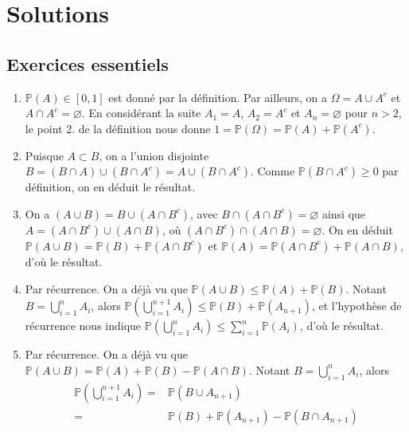 \chapter{Solutions}

\section{Exercices essentiels}\label{I-exercices-essentiels}

\label{I-answer-propelem}

\begin{enumerate}
\def\labelenumi{\arabic{enumi}.}
\item
  \(\mathbb{P}(A) \in [0,1]\) est donné par la définition. Par ailleurs,
  on a \(\Omega = A \cup A^c\) et \(A\cap A^c = \varnothing\). En
  considérant la suite \(A_1 = A\), \(A_2 = A^c\) et
  \(A_n = \varnothing\) pour \(n > 2\), le point 2. de la définition
  nous donne
  \(1 = \mathbb{P}(\Omega) = \mathbb{P}(A) + \mathbb{P}(A^c)\).
\item
  Puisque \(A \subset B\), on a l'union disjointe
  \(B = (B\cap A) \cup (B\cap A^c) = A \cup (B\cap A^c)\). Comme
  \(\mathbb{P}(B\cap A^c) \geq 0\) par définition, on en déduit le
  résultat.
\item
  On a \((A\cup B) = B \cup (A\cap B^c)\), avec
  \(B \cap (A\cap B^c) =\varnothing\) ainsi que
  \(A = (A\cap B^c) \cup (A\cap B)\), où
  \((A\cap B^c) \cap (A\cap B) = \varnothing\). On en déduit
  \(\mathbb{P}(A\cup B) = \mathbb{P}(B) + \mathbb{P}(A\cap B^c)\) et
  \(\mathbb{P}(A) = \mathbb{P}(A\cap B^c) + \mathbb{P}(A\cap B)\), d'où
  le résultat.
\item
  Par récurrence. On a déjà vu que
  \(\mathbb{P}(A\cup B) \leq \mathbb{P}(A) + \mathbb{P}(B)\). Notant
  \(B = \bigcup_{i=1}^n A_i\), alors
  \(\mathbb{P}(\bigcup_{i=1}^{n+1} A_i) \leq \mathbb{P}(B) + \mathbb{P}(A_{n+1})\),
  et l'hypothèse de récurrence nous indique
  \(\mathbb{P}\left(\bigcup_{i=1}^n A_i\right) \leq \sum_{i=1}^n \mathbb{P}(A_i)\),
  d'où le résultat.
\item
  Par récurrence. On a déjà vu que
  \(\mathbb{P}(A \cup B ) = \mathbb{P}(A) + \mathbb{P}(B) - \mathbb{P}(A \cap B)\).
  Notant \(B = \bigcup_{i=1}^n A_i\), alors \begin{align*}
      \mathbb{P}(\bigcup_{i=1}^{n+1} A_i) =& \mathbb{P}(B \cup A_{n+1}) \\
                                  =& \mathbb{P}(B) + \mathbb{P}(A_{n+1}) - \mathbb{P}(B \cap A_{n+1}) \\

\end{align*}
\end{enumerate}
